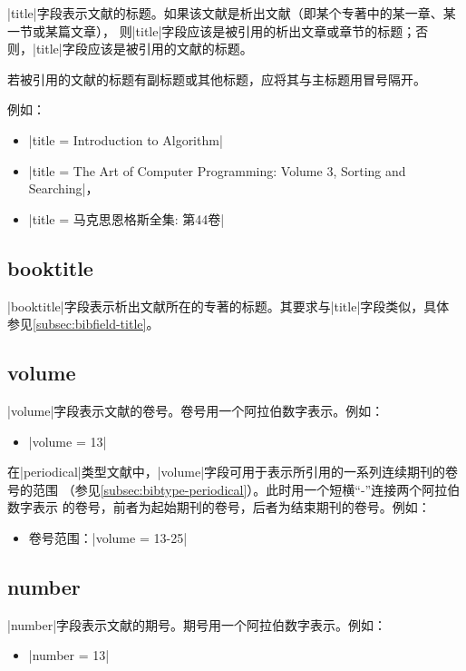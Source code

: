 |title|字段表示文献的标题。如果该文献是析出文献（即某个专著中的某一章、某一节或某篇文章），
则|title|字段应该是被引用的析出文章或章节的标题；否则，|title|字段应该是被引用的文献的标题。

若被引用的文献的标题有副标题或其他标题，应将其与主标题用冒号隔开。

例如：
\begin{itemize}
\item |title = {Introduction to Algorithm}|
\item |title = {The Art of Computer Programming: Volume 3, Sorting and Searching}|，
\item |title = {马克思恩格斯全集: 第44卷}|
\end{itemize}

\subsection{booktitle}\label{subsec:bibfield-booktitle}

|booktitle|字段表示析出文献所在的专著的标题。其要求与|title|字段类似，具体
参见\ref{subsec:bibfield-title}。

\subsection{volume}\label{subsec:bibfield-volume}

|volume|字段表示文献的卷号。卷号用一个阿拉伯数字表示。例如：
\begin{itemize}
\item |volume = {13}|
\end{itemize}

在|periodical|类型文献中，|volume|字段可用于表示所引用的一系列连续期刊的卷号的范围
（参见\ref{subsec:bibtype-periodical}）。此时用一个短横``-''连接两个阿拉伯数字表示
的卷号，前者为起始期刊的卷号，后者为结束期刊的卷号。例如：
\begin{itemize}
\item 卷号范围：|volume = {13-25}|
\end{itemize}

\subsection{number}\label{subsec:bibfield-number}

|number|字段表示文献的期号。期号用一个阿拉伯数字表示。例如：
\begin{itemize}
\item |number = {13}|
\end{itemize}

